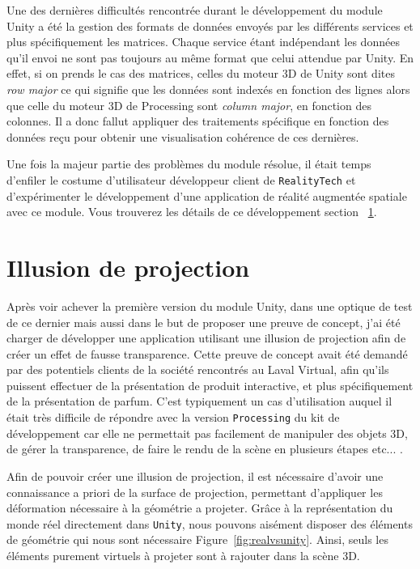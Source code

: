 Une des dernières difficultés rencontrée durant le développement du module Unity a été la gestion des formats de données envoyés par les différents services et plus spécifiquement les matrices. Chaque service étant indépendant les données qu'il envoi ne sont pas toujours au même format que celui attendue par Unity. En effet, si on prends le cas des matrices, celles du moteur 3D de Unity sont dites \emph{row major} ce qui signifie que les données sont indexés en fonction des lignes alors que celle du moteur 3D de Processing sont \emph{column major}, en fonction des colonnes. Il a donc fallut appliquer des traitements spécifique en fonction des données reçu pour obtenir une visualisation cohérence de ces dernières.

Une fois la majeur partie des problèmes du module résolue, il était temps d'enfiler le costume d'utilisateur développeur client de \texttt{RealityTech} et d'expérimenter le développement d'une application de réalité augmentée spatiale avec ce module. Vous trouverez les détails de ce développement section ~\ref{sec:unity:appli}.

\section{Illusion de projection}
\label{sec:unity:appli}

Après voir achever la première version du module Unity, dans une optique de test de ce dernier mais aussi dans le but de proposer une preuve de concept, j'ai été charger de développer une application utilisant une illusion de projection afin de créer un effet de fausse transparence. Cette preuve de concept avait été demandé par des potentiels clients de la société rencontrés au Laval Virtual, afin qu'ils puissent effectuer de la présentation de produit interactive, et plus spécifiquement de la présentation de parfum. C'est typiquement un cas d'utilisation auquel il était très difficile de répondre avec la version \texttt{Processing} du kit de développement car elle ne permettait pas facilement de manipuler des objets 3D, de gérer la transparence, de faire le rendu de la scène en plusieurs étapes etc... . 

Afin de pouvoir créer une illusion de projection, il est nécessaire d'avoir une connaissance a priori de la surface de projection, permettant d'appliquer les déformation nécessaire à la géométrie a projeter. Grâce à la représentation du monde réel directement dans \texttt{Unity}, nous pouvons aisément disposer des éléments de géométrie qui nous sont nécessaire Figure~\ref{fig:realvsunity}. Ainsi, seuls les éléments purement virtuels à projeter sont à rajouter dans la scène 3D.

